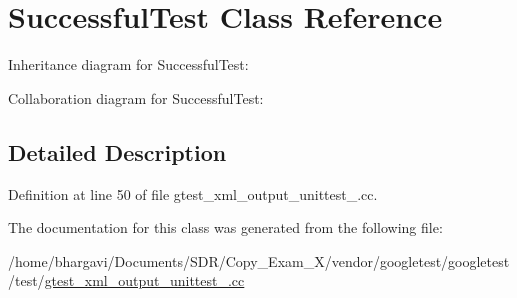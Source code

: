 \hypertarget{class_successful_test}{}\section{Successful\+Test Class Reference}
\label{class_successful_test}


Inheritance diagram for Successful\+Test\+:


Collaboration diagram for Successful\+Test\+:


\subsection{Detailed Description}


Definition at line 50 of file gtest\+\_\+xml\+\_\+output\+\_\+unittest\+\_\+.\+cc.



The documentation for this class was generated from the following file\+:\begin{DoxyCompactItemize}
\item 
/home/bhargavi/\+Documents/\+S\+D\+R/\+Copy\+\_\+\+Exam\+\_\+X/vendor/googletest/googletest/test/\hyperlink{gtest__xml__output__unittest___8cc}{gtest\+\_\+xml\+\_\+output\+\_\+unittest\+\_\+.\+cc}\end{DoxyCompactItemize}
